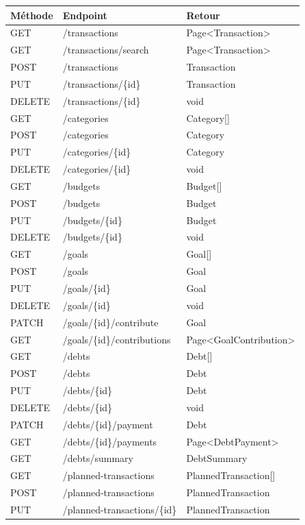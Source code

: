 \documentclass[12pt,a4paper]{article}
\begin{document}
\begin{longtable}{>{\small}L{1.9cm} >{\small\ttfamily}L{7.4cm} >{\small\ttfamily}L{4.5cm}}
\toprule
\textbf{Méthode} & \textbf{Endpoint} & \textbf{Retour} \\
\midrule
GET & /transactions & Page\textless Transaction\textgreater \\
GET & /transactions/search & Page\textless Transaction\textgreater \\
POST & /transactions & Transaction \\
PUT & /transactions/\{id\} & Transaction \\
DELETE & /transactions/\{id\} & void \\
\midrule
GET & /categories & Category[] \\
POST & /categories & Category \\
PUT & /categories/\{id\} & Category \\
DELETE & /categories/\{id\} & void \\
\midrule
GET & /budgets & Budget[] \\
POST & /budgets & Budget \\
PUT & /budgets/\{id\} & Budget \\
DELETE & /budgets/\{id\} & void \\
\midrule
GET & /goals & Goal[] \\
POST & /goals & Goal \\
PUT & /goals/\{id\} & Goal \\
DELETE & /goals/\{id\} & void \\
PATCH & /goals/\{id\}/contribute & Goal \\
GET & /goals/\{id\}/contributions & Page\textless GoalContribution\textgreater \\
\midrule
GET & /debts & Debt[] \\
POST & /debts & Debt \\
PUT & /debts/\{id\} & Debt \\
DELETE & /debts/\{id\} & void \\
PATCH & /debts/\{id\}/payment & Debt \\
GET & /debts/\{id\}/payments & Page\textless DebtPayment\textgreater \\
GET & /debts/summary & DebtSummary \\
\midrule
GET & /planned-transactions & PlannedTransaction[] \\
POST & /planned-transactions & PlannedTransaction \\
PUT & /planned-transactions/\{id\} & PlannedTransaction \\

\end{longtable}
\end{document}
